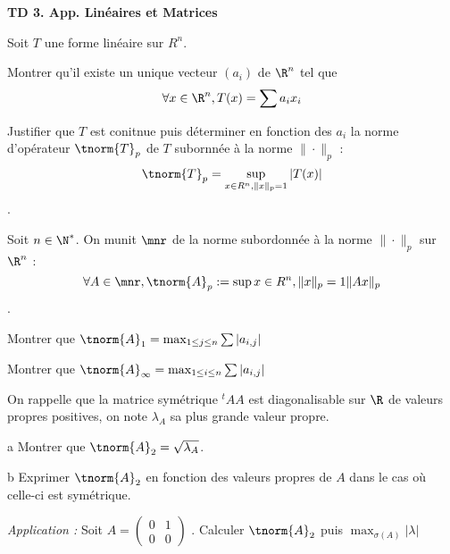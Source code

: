 \documentclass{report}
\begin{document}
\begin{center}
    \Huge{\textbf{TD 3. App. Linéaires et Matrices}}
\end{center}
\bigskip

\begin{exo}
    Soit \(T\) une forme linéaire sur \(R^n\).
    \begin{q}{1}
        Montrer qu'il existe un unique vecteur \((a_i)\) de \(\R^n\) tel que
        \[\forall x\in\R^n, T(x)=\sum a_ix_i\]
    \end{q}
    \begin{q}{2}
        Justifier que \(T\) est conitnue puis déterminer en fonction des \(a_i\)
        la norme d'opérateur \(\tnorm{T}_p\) de \(T\) subornnée à
        la norme \(\|\cdot\|_p\) : \[\tnorm{T}_p=\sup_{x\in R^n
        ,\|x\|_p=1}|T(x)|\].
    \end{q}
\end{exo}

\begin{exo}
    Soit \(n\in\N^*\). On munit \(\mnr\) de la norme subordonnée à la norme
    \(\|\cdot\|_p\) sur \(\R^n\) :
    \[\forall A\in\mnr, \tnorm{A}_p := \sup{x\in R^n,\|x\|_p=1} \|Ax\|_p\].
    \begin{q}{1}
        Montrer que \(\tnorm{A}_1=\max_{1\leq j\leq n} \sum |a_{i,j}|\)
    \end{q}
    \begin{q}{2}
        Montrer que \(\tnorm{A}_\infty=\max_{1\leq i\leq n} \sum |a_{i,j}|\)
    \end{q}
    \begin{q}{3}
        On rappelle que la matrice symétrique \(^tAA\) est diagonalisable
        sur \(\R\) de valeurs propres positives, on note \(\lambda_A\) sa
        plus grande valeur propre.
        \begin{q}{a}
            Montrer que \(\tnorm{A}_2=\sqrt{\lambda_A}\).
        \end{q}
        \begin{q}{b}
            Exprimer \(\tnorm{A}_2\) en fonction des valeurs propres de
            \(A\) dans le cas où celle-ci est symétrique.
        \end{q}
    \end{q}
    \begin{q}{4}
        \textit{Application :} Soit \(A=\begin{pmatrix}0&1\\0&0\end{pmatrix}\)
        . Calculer \(\tnorm{A}_2\) puis \(\max_{\sigma(A)}|\lambda|\)
    \end{q}
\end{exo}
\end{document}
